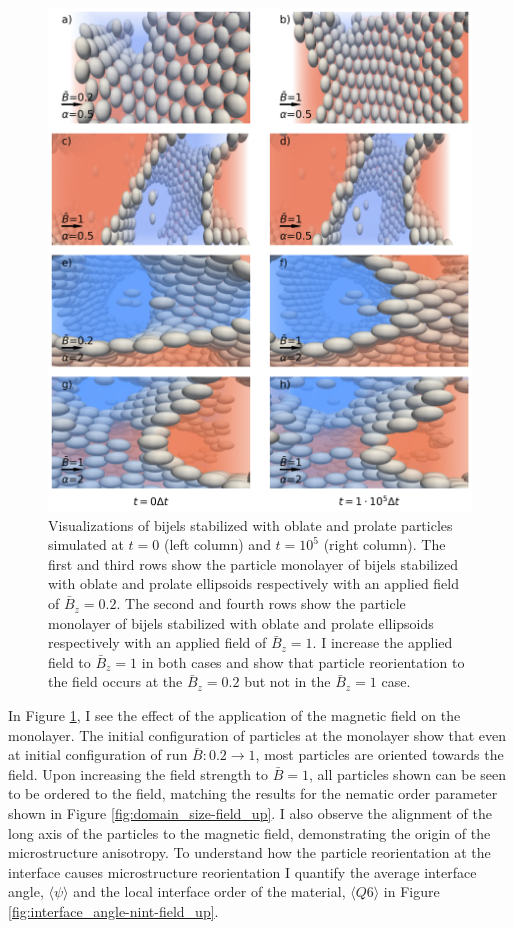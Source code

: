 \begin{figure} 
\centering 
\includegraphics[scale=0.2]{../figures/results/paper2/particle_viz-field_up.png} 
\caption{Visualizations of bijels stabilized with oblate and prolate particles simulated at $t = 0$ (left column) and $t = 10^5$ (right column). 
         The first and third rows show the particle monolayer of bijels stabilized with oblate and prolate ellipsoids respectively with an applied 
         field of $\bar{B}_z = 0.2$. The second and fourth rows show the particle monolayer of bijels stabilized with oblate and prolate ellipsoids 
         respectively with an applied field of $\bar{B}_z = 1$. I increase the applied field to $\bar{B}_z = 1$ in both cases and show that particle 
         reorientation to the field occurs at the $\bar{B}_z = 0.2$ but not in the $\bar{B}_z = 1$ case.} 
\label{fig:particle_viz-field_up} 
\end{figure}

In Figure \ref{fig:particle_viz-field_up}, I see the effect of the
application of the magnetic field on the monolayer. The initial
configuration of particles at the monolayer show that even at initial
configuration of run $\bar{B}: 0.2 \rightarrow 1$, most particles are
oriented towards the field. Upon increasing the field strength to
$\bar{B} = 1$, all particles shown can be seen to be ordered to the
field, matching the results for the nematic order parameter shown in
Figure \ref{fig:domain_size-field_up}. I also observe the alignment of
the long axis of the particles to the magnetic field, demonstrating the
origin of the microstructure anisotropy. To understand how the particle
reorientation at the interface causes microstructure reorientation I
quantify the average interface angle, $\langle \psi \rangle$ and the
local interface order of the material, $\langle Q6 \rangle$ in Figure
\ref{fig:interface_angle-nint-field_up}.

